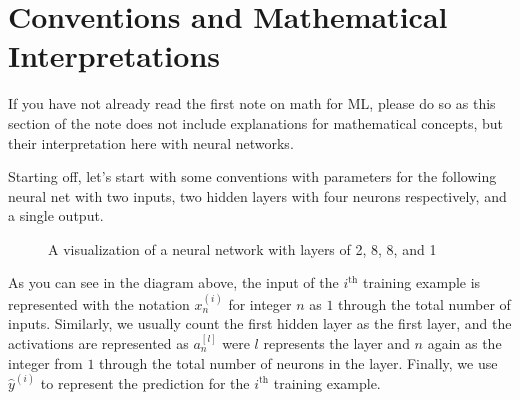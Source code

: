 \documentclass[../main.tex]{subfiles}
\begin{document}
\section{Conventions and Mathematical Interpretations}

If you have not already read the first note on math for ML,
please do so as this section of the note does not include explanations
for mathematical concepts, but their interpretation here with
neural networks.

Starting off, let's start with some conventions with parameters for
the following neural net with two inputs, two hidden layers with
four neurons respectively, and a single output.

\begin{figure}[H]
\centering
{}
\caption{A visualization of a neural network with layers of 2, 8,
         8, and 1}
\end{figure}

As you can see in the diagram above, the input of the $i^\text{th}$
training example is represented with the notation $x_n^{(i)}$ for
integer $n$ as $1$ through the total number of inputs. Similarly,
we usually count the first hidden layer as the first layer, and the
activations are represented as $a_n^{[l]}$ were $l$ represents the
layer and $n$ again as the integer from $1$ through the total number
of neurons in the layer. Finally, we use $\hat{y}^{(i)}$ to
represent the prediction for the $i^\text{th}$ training example.
\end{document}
